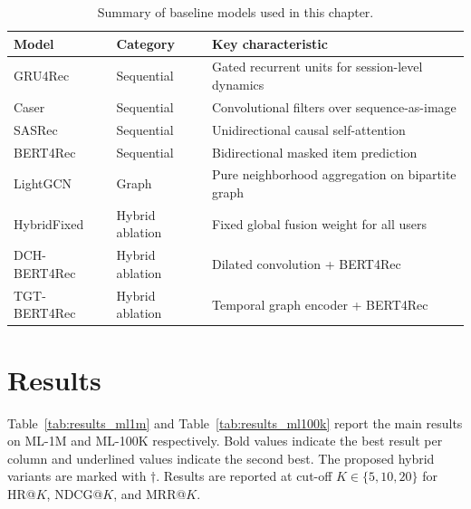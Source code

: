 \documentclass[12pt,a4paper]{report}
\begin{document}
\begin{table}[h]
\centering
\caption{Summary of baseline models used in this chapter.}
\label{tab:baselines}
\begin{tabular}{p{3.2cm} p{2.5cm} p{7.0cm}}
\toprule
\textbf{Model} & \textbf{Category} & \textbf{Key characteristic} \\
\midrule
GRU4Rec   & Sequential & Gated recurrent units for session-level dynamics \\
Caser     & Sequential & Convolutional filters over sequence-as-image \\
SASRec    & Sequential & Unidirectional causal self-attention \\
BERT4Rec  & Sequential & Bidirectional masked item prediction \\
LightGCN  & Graph      & Pure neighborhood aggregation on bipartite graph \\
HybridFixed    & Hybrid ablation & Fixed global fusion weight for all users \\
DCH-BERT4Rec   & Hybrid ablation & Dilated convolution + BERT4Rec \\
TGT-BERT4Rec   & Hybrid ablation & Temporal graph encoder + BERT4Rec \\
\bottomrule
\end{tabular}
\end{table}

\section{Results}
\label{sec:results}

Table~\ref{tab:results_ml1m} and Table~\ref{tab:results_ml100k} report the
main results on ML-1M and ML-100K respectively. Bold values indicate the best
result per column and underlined values indicate the second best. The proposed
hybrid variants are marked with \(\dagger\). Results are reported at cut-off
\(K \in \{5, 10, 20\}\) for HR@\(K\), NDCG@\(K\), and MRR@\(K\).
\end{document}
